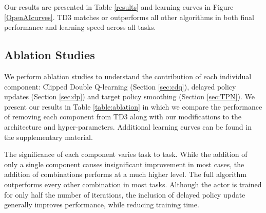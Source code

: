 \documentclass{article}
\begin{document}
Our results are presented in Table \ref{results} and learning curves in Figure \ref{OpenAIcurves}. TD3 matches or outperforms all other algorithms in both final performance and learning speed across all tasks. 

\subsection{Ablation Studies}

We perform ablation studies to understand the contribution of each individual component: Clipped Double Q-learning (Section \ref{sec:cdq}), delayed policy updates (Section \ref{sec:dp}) and target policy smoothing (Section \ref{sec:TPN}). We present our results in Table \ref{table:ablation} in which we compare the performance of removing each component from TD3 along with our modifications to the architecture and hyper-parameters. Additional learning curves can be found in the supplementary material. 

The significance of each component varies task to task. While the addition of only a single component causes insignificant improvement in most cases, the addition of combinations performs at a much higher level.  The full algorithm outperforms every other combination in most tasks. Although the actor is trained for only half the number of iterations, the inclusion of delayed policy update generally improves performance, while reducing training time. 
\end{document}
